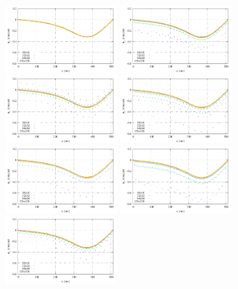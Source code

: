 \documentclass[a4paper,12pt]{article}
\begin{document}
\begin{figure}[t]
\centering
\includegraphics[width=4.3cm]{../results/exp08/vel_profile_topo0_full.pdf}
\includegraphics[width=4.3cm]{../results/exp08/vel_profile_topo1_full.pdf}
\includegraphics[width=4.3cm]{../results/exp08/vel_profile_topo2_full.pdf}
\includegraphics[width=4.3cm]{../results/exp08/vel_profile_topo3_full.pdf}\\
\includegraphics[width=4.3cm]{../results/exp08/vel_profile_topo4_full.pdf}
\includegraphics[width=4.3cm]{../results/exp08/vel_profile_topo5_full.pdf}
\includegraphics[width=4.3cm]{../results/exp08/vel_profile_topo6_full.pdf}

\end{figure}
\end{document}
